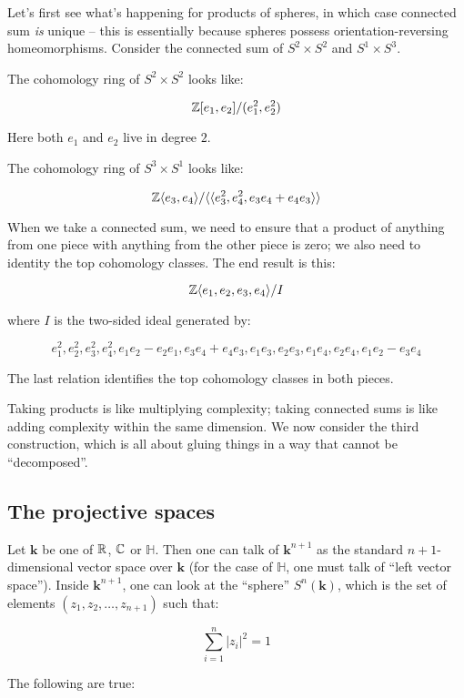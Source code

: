 \documentclass[a4paper]{amsart}
\newcommand{\field}{\mathbf{k}}
\newcommand{\Quat}{\mathbb{H}}
\begin{document}
Let's first see what's happening for products of spheres, in which
case connected sum {\em is} unique -- this is essentially because
spheres possess orientation-reversing homeomorphisms. Consider the connected sum of $S^2 \times S^2$ and $S^1 \times S^3$.

The cohomology ring of $S^2 \times S^2$ looks like:

$$\mathbb{Z}[e_1,e_2]/(e_1^2,e_2^2) $$

Here both $e_1$ and $e_2$ live in degree $2$.

The cohomology ring of $S^3 \times S^1$ looks like:

$$\mathbb{Z}\langle e_3,e_4\rangle/\langle \langle e_3^2,e_4^2, e_3e_4 + e_4e_3 \rangle \rangle$$

When we take a connected sum, we need to ensure that a product of
anything from one piece with anything from the other piece is zero; we
also need to identity the top cohomology classes. The end result is this:

$$\mathbb{Z} \langle e_1, e_2, e_3, e_4 \rangle/I$$

where $I$ is the two-sided ideal generated by:

$$e_1^2, e_2^2, e_3^2, e_4^2, e_1e_2 - e_2e_1, e_3e_4 + e_4e_3, e_1e_3, e_2e_3, e_1e_4, e_2e_4, e_1e_2 - e_3e_4$$

The last relation identifies the top cohomology classes in both pieces.

Taking products is like multiplying complexity; taking connected sums
is like adding complexity within the same dimension. We now consider
the third construction, which is all about gluing things in a way that
cannot be ``decomposed''.

\subsection{The projective spaces}

Let $\field$ be one of $\mathbb{R}$, $\mathbb{C}$ or $\Quat$. Then one can talk of
$\field^{n+1}$ as the standard $n+1$-dimensional vector space over
$\field$ (for the case of $\Quat$, one must talk of ``left vector
space'').  Inside $\field^{n+1}$, one can look at the ``sphere'' $S^n(\field)$,
which is the set of elements $(z_1, z_2, \ldots, z_{n+1})$ such that:

$$\sum_{i=1}^n |z_i|^2 = 1$$

The following are true:
\end{document}
